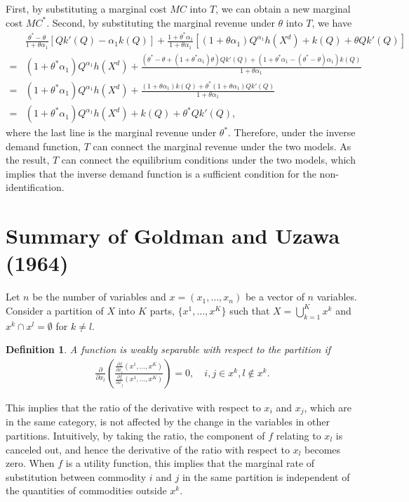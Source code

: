 \documentclass[11pt, a4paper]{article}
\newtheorem{definition}{Definition}
\theoremstyle{remark}
\begin{document}
First, by substituting a marginal cost $MC$ into $T$, we can obtain a new marginal cost $MC^{*}$.
Second, by substituting the marginal revenue under $\theta$ into $T$, we have
\begin{align}
    & \frac{\theta^{*} - \theta}{1 + \theta\alpha_1} \left[Qk'(Q) - \alpha_1k(Q) \right] + \frac{1 + \theta^{*}\alpha_1}{1 + \theta\alpha_1} \left[(1+\theta\alpha_1) Q^{\alpha_1}h(X^{d}) + k(Q) + \theta Qk'(Q)\right]\\
    = & (1 + \theta^{*}\alpha_1)Q^{\alpha_1}h(X^{d}) + \frac{(\theta^{*} - \theta + (1 + \theta^{*}\alpha_1)\theta)Qk'(Q) + (1 + \theta^{*}\alpha_1 - (\theta^{*} - \theta)\alpha_1) k(Q)}{1 + \theta\alpha_1}\\
    = & (1 + \theta^{*}\alpha_1)Q^{\alpha_1}h(X^{d}) + \frac{(1 + \theta\alpha_1) k(Q) + \theta^{*}(1 + \theta\alpha_1)Qk'(Q) }{1 + \theta\alpha_1}\\
    = & (1 + \theta^{*}\alpha_1)Q^{\alpha_1}h(X^{d}) +k(Q) + \theta^{*}Qk'(Q),
\end{align}
where the last line is the marginal revenue under $\theta^{*}$.
Therefore, under the inverse demand function, $T$ can connect the marginal revenue under the two models.
As the result, $T$ can connect the equilibrium conditions under the two models, which implies that the inverse demand function is a sufficient condition for the non-identification.



\section{Summary of Goldman and Uzawa (1964)}\label{appendix:summary_goldman_uzawa}

Let $n$ be the number of variables and $x = (x_{1},\ldots, x_{n})$ be a vector of $n$ variables.
Consider a partition of $X$ into $K$ parts, $\{x^1, \ldots, x^K\}$ such that $X = \bigcup_{k=1}^K x^k$ and $x^k \cap x^l = \emptyset$ for $k\ne l$.
\begin{definition}\label{def:weal_separable}
    A function is weakly separable with respect to the partition if 
    \begin{align}
        \frac{\partial}{\partial x_l}\left(\frac{\frac{\partial f}{\partial x_i}(x^1, \ldots, x^K)}{\frac{\partial f}{\partial x_j}(x^1, \ldots, x^K)}\right) = 0, \quad i,j\in x^k, l \notin x^k.
    \end{align}
\end{definition}
This implies that the ratio of the derivative with respect to $x_i$ and $x_j$, which are in the same category, is not affected by the change in the variables in other partitions.
Intuitively, by taking the ratio, the component of $f$ relating to $x_l$ is canceled out, and hence the derivative of the ratio with respect to $x_l$ becomes zero.
When $f$ is a utility function, this implies that the marginal rate of substitution between commodity $i$ and $j$ in the same partition is independent of the quantities of commodities outside $x^k$.
\end{document}
